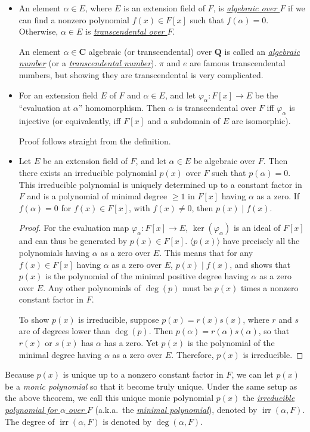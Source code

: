 \documentclass[11pt]{article}
\newcommand{\Q}{\mathbf{Q}}
\newcommand{\C}{\mathbf{C}}
\newcommand{\df}[1]{\ul{\textit{\textsf{#1}}}}
\newcommand{\gen}[1]{\langle #1 \rangle}
\newcommand{\irr}{\operatorname{irr}}
\renewcommand{\phi}{\varphi}
\begin{document}
\begin{itemize}
    \item An element $\alpha \in E$, where $E$ is an extension field of $F$, is \df{algebraic over $F$} if we can find a nonzero polynomial $f(x) \in F[x]$ such that $f(\alpha) = 0$. Otherwise, $\alpha \in E$ is \df{transcendental over $F$}.
    
    An element $\alpha \in \C$ algebraic (or transcendental) over $\Q$ is called an \df{algebraic number} (or a \df{transcendental number}). $\pi$ and $e$ are famous transcendental numbers, but showing they are transcendental is very complicated.
    \item For an extension field $E$ of $F$ and $\alpha \in E$, and let $\phi_\alpha: F[x] \to E$ be the ``evaluation at $\alpha$'' homomorphism. Then $\alpha$ is transcendental over $F$ iff $\phi_\alpha$ is injective (or equivalently, iff $F[x]$ and a subdomain of $E$ are isomorphic).

    Proof follows straight from the definition.
    \item Let $E$ be an extension field of $F$, and let $\alpha \in E$ be algebraic over $F$. Then there exists an irreducible polynomial $p(x)$ over $F$ such that $p(\alpha) = 0$. This irreducible polynomial is uniquely determined up to a constant factor in $F$ and is a polynomial of minimal degree $\geq 1$ in $F[x]$ having $\alpha$ as a zero. If $f(\alpha) = 0$ for $f(x) \in F[x]$, with $f(x) \neq 0$, then $p(x) \mid f(x)$.
    \begin{proof}
        For the evaluation map $\phi_\alpha: F[x] \to E$, $\ker(\phi_\alpha)$ is an ideal of $F[x]$ and can thus be generated by $p(x) \in F[x]$. $\gen{p(x)}$ have precisely all the polynomials having $\alpha$ as a zero over $E$. This means that for any $f(x) \in F[x]$ having $\alpha$ as a zero over $E$, $p(x) \mid f(x)$, and shows that $p(x)$ is the polynomial of the minimal positive degree having $\alpha$ as a zero over $E$. Any other polynomials of $\deg(p)$ must be $p(x)$ times a nonzero constant factor in $F$.

        To show $p(x)$ is irreducible, suppose $p(x) = r(x)s(x)$, where $r$ and $s$ are of degrees lower than $\deg(p)$. Then $p(\alpha) = r(\alpha)s(\alpha)$, so that $r(x)$ or $s(x)$ has $\alpha$ has a zero. Yet $p(x)$ is the polynomial of the minimal degree having $\alpha$ as a zero over $E$. Therefore, $p(x)$ is irreducible.
    \end{proof}  
\end{itemize}
\begin{framed}
    Because $p(x)$ is unique up to a nonzero constant factor in $F$, we can let $p(x)$ be a \emph{monic polynomial} so that it become truly unique. Under the same setup as the above theorem, we call this unique monic polynomial $p(x)$ the \df{irreducible polynomial for $\alpha$ over $F$} (a.k.a.\ the \df{minimal polynomial}), denoted by $\irr(\alpha,F)$. The degree of $\irr(\alpha,F)$ is denoted by $\deg(\alpha,F)$.
\end{framed}
\end{document}
